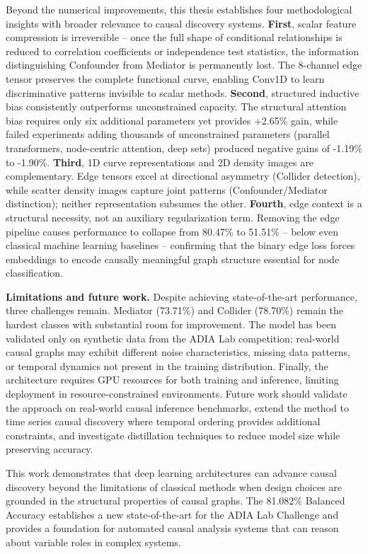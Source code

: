 Beyond the numerical improvements, this thesis establishes four methodological insights with broader relevance to causal discovery systems. \textbf{First}, scalar feature compression is irreversible -- once the full shape of conditional relationships is reduced to correlation coefficients or independence test statistics, the information distinguishing Confounder from Mediator is permanently lost. The 8-channel edge tensor preserves the complete functional curve, enabling Conv1D to learn discriminative patterns invisible to scalar methods. \textbf{Second}, structured inductive bias consistently outperforms unconstrained capacity. The structural attention bias requires only six additional parameters yet provides +2.65\% gain, while failed experiments adding thousands of unconstrained parameters (parallel transformers, node-centric attention, deep sets) produced negative gains of -1.19\% to -1.90\%. \textbf{Third}, 1D curve representations and 2D density images are complementary. Edge tensors excel at directional asymmetry (Collider detection), while scatter density images capture joint patterns (Confounder/Mediator distinction); neither representation subsumes the other. \textbf{Fourth}, edge context is a structural necessity, not an auxiliary regularization term. Removing the edge pipeline causes performance to collapse from 80.47\% to 51.51\% -- below even classical machine learning baselines -- confirming that the binary edge loss forces embeddings to encode causally meaningful graph structure essential for node classification.

\textbf{Limitations and future work.} Despite achieving state-of-the-art performance, three challenges remain. Mediator (73.71\%) and Collider (78.70\%) remain the hardest classes with substantial room for improvement. The model has been validated only on synthetic data from the ADIA Lab competition; real-world causal graphs may exhibit different noise characteristics, missing data patterns, or temporal dynamics not present in the training distribution. Finally, the architecture requires GPU resources for both training and inference, limiting deployment in resource-constrained environments. Future work should validate the approach on real-world causal inference benchmarks, extend the method to time series causal discovery where temporal ordering provides additional constraints, and investigate distillation techniques to reduce model size while preserving accuracy.

This work demonstrates that deep learning architectures can advance causal discovery beyond the limitations of classical methods when design choices are grounded in the structural properties of causal graphs. The 81.082\% Balanced Accuracy establishes a new state-of-the-art for the ADIA Lab Challenge and provides a foundation for automated causal analysis systems that can reason about variable roles in complex systems.
